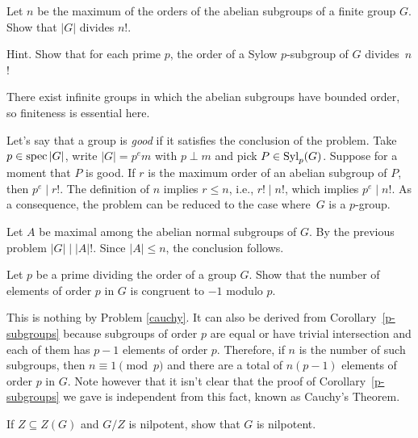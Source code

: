  \begin{probl}
     Let\/ $n$ be the maximum of the orders of the abelian subgroups of a finite group\/ $G$. Show that\/ $|G|$ divides\/ $n!$.
    
    \textrm{\upshape Hint. Show that for each prime $p$, the order of a Sylow $p$-subgroup of $G$ divides~$n$!}

    \textrm{ There exist infinite groups in which the abelian subgroups have bounded order, so finiteness is essential here.}
 \end{probl}

\begin{solution} Let's say that a group is \textsl{good} if it satisfies the conclusion of the problem. Take $p\in\operatorname{spec}|G|$, write $|G|=p^em$ with $p\perp m$ and pick $P\in{\rm Syl}_p(G)$. Suppose for a moment that $P$ is good. If $r$ is the maximum order of an abelian subgroup of $P$, then $p^e\mid r!$. The definition of $n$ implies $r\le n$, i.e., $r!\mid n!$, which implies $p^e\mid n!$. As a consequence, the problem can be reduced to the case where~$G$ is a $p$-group.

Let $A$ be maximal among the abelian normal subgroups of $G$. By the previous problem $|G|\mid |A|!$. Since $|A|\le n$, the conclusion follows.  \end{solution}

\begin{probl}
    Let\/ $p$ be a prime dividing the order of a group\/ $G$. Show that the number of elements of order\/ $p$ in\/ $G$ is congruent to\/ $-1$ modulo\/ $p$.
\end{probl}

\begin{solution} This is nothing by Problem \ref{cauchy}. It can also be derived from Corollary~\ref{p-subgroups} because subgroups of order $p$ are equal or have trivial intersection and each of them has $p-1$ elements of order $p$. Therefore, if $n$ is the number of such subgroups, then $n\equiv1\pmod p$ and there are a total of $n(p-1)$ elements of order $p$ in $G$. Note however that it isn't clear that the proof of Corollary~\ref{p-subgroups} we gave is independent from this fact, known as Cauchy's Theorem.  \end{solution}

\begin{probl}\label{problem-1.D.13}
    If $Z \subseteq Z(G)$ and $G/Z$ is nilpotent, show that\/ $G$ is nilpotent.
\end{probl}

